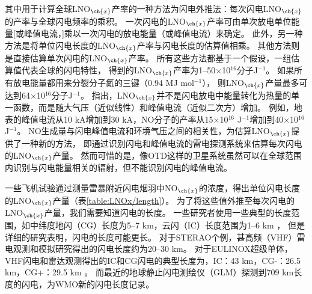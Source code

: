 其中用于计算全球LNO$_{\ch{x}}$产率的一种方法为闪电外推法：每次闪电LNO$_{\ch{x}}$的产率与全球闪电频率的乘积\citep{Lawrence.1995}。
一次闪电的LNO$_{\ch{x}}$产率可由单次放电单位能量[或峰值电流，\citet{Wang.1998}]乘以一次闪电的放电能量（或峰值电流）来确定。
此外，另一种方法是将单位闪电长度的LNO$_{\ch{x}}$产率与闪电长度的估算值相乘。
其他方法则是直接估算单次闪电的LNO$_{\ch{x}}$产率。
所有这些方法都基于一个假设，一组估算值代表全球的闪电特性，
得到的LNO$_{\ch{x}}$产率为1--50$\times$10$^{16}$分子J$^{-1}$。
如果所有放电能量都用来分裂分子氮的三键（0.94 MJ mol$^{-1}$），
则LNO$_{\ch{x}}$产量最多可达到64$\times$10$^{16}$分子J$^{-1}$。
\citet{Wang.1998}指出，LNO$_{\ch{x}}$并不是闪电放电中能量转化为热量的单一函数，而是随大气压（近似线性）和峰值电流（近似二次方）增加。
例如，地表的峰值电流从10 kA增加到30 kA，NO分子的产率从15$\times$10$^{16}$ J$^{-1}$增加到40$\times$10$^{16}$ J$^{-1}$。
NO生成量与闪电峰值电流和环境气压之间的相关性，为估算LNO$_{\ch{x}}$提供了一种新的方法，
即通过识别闪电和峰值电流的雷电探测系统来估算每次闪电的LNO$_{\ch{x}}$产量。
然而可惜的是，像OTD这样的卫星系统虽然可以在全球范围内识别与闪电能量相关的辐射\citep{Baker.1999}，但不能识别闪电的峰值电流。

一些飞机试验通过测量雷暴附近闪电烟羽中NO$_{\ch{x}}$的浓度，得出单位闪电长度的LNO$_{\ch{x}}$产量（表\ref{table:LNOx/length}）。
为了将这些值外推至每次闪电的LNO$_{\ch{x}}$产量，我们需要知道闪电的长度。
一些研究者使用一些典型的长度范围，如中纬度地闪（CG）长度为5--7 km，云闪（IC）长度范围为1--6 km \citep{Price.1997b}，
但是详细的研究表明，闪电的长度可能更长\citep{Defer.2001,Thery.2001,Peterson.2020b}。
对于STERAO个例，甚高频（VHF）雷电观测和模拟研究得出的闪电长度约为20--30 km\citep{Defer.2001}。
对于EULINOX超级单体，VHF闪电和雷达观测得出的IC和CG闪电的典型长度为，IC：43 km，CG-：26.5 km，CG+：29.5 km \citep{Dotzek.2000}。
而最近的地球静止闪电测绘仪（GLM）探测到709 km长度的闪电，为WMO新的闪电长度记录\citep{Peterson.2020b}。



